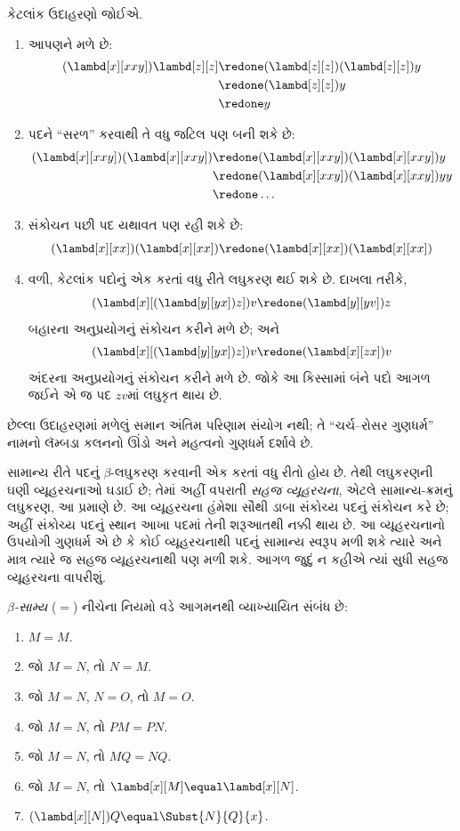 કેટલાંક ઉદાહરણો જોઈએ.
\begin{enumerate}
\item આપણને મળે છે:
\begin{align*}
(\lambd[x][xxy]) \lambd[z][z] & \redone (\lambd[z][z])(\lambd[z][z]) y \\
& \redone (\lambd[z][z]) y \\
& \redone y
\end{align*}
\item પદને ``સરળ'' કરવાથી તે વધુ જટિલ પણ બની શકે છે:
\begin{align*}
(\lambd[x][xxy])(\lambd[x][xxy]) & \redone (\lambd[x][xxy])(\lambd[x][xxy])y \\
& \redone (\lambd[x][xxy])(\lambd[x][xxy])yy \\
& \redone \dots
\end{align*}
\item સંકોચન પછી પદ યથાવત પણ રહી શકે છે:
\[
(\lambd[x][xx])(\lambd[x][xx]) \redone (\lambd[x][xx])(\lambd[x][xx])
\]
\item વળી, કેટલાંક પદોનું એક કરતાં વધુ રીતે લઘુકરણ
  થઈ શકે છે. દાખલા તરીકે,
\[
(\lambd[x][(\lambd[y][yx]) z]) v \redone (\lambd[y][yv]) z
\]
બહારના અનુપ્રયોગનું સંકોચન કરીને મળે છે; અને
\[
(\lambd[x][(\lambd[y][yx]) z]) v \redone (\lambd[x][zx]) v
\]
અંદરના અનુપ્રયોગનું સંકોચન કરીને મળે છે. જોકે આ
કિસ્સામાં બંને પદો આગળ જઈને એ જ પદ $zv$માં લઘુકૃત
થાય છે.
\end{enumerate}

છેલ્લા ઉદાહરણમાં મળેલું સમાન અંતિમ પરિણામ સંયોગ નથી;
તે ``ચર્ચ--રોસર ગુણધર્મ'' નામનો લૅમ્બડા કલનનો ઊંડો
અને મહત્વનો ગુણધર્મ દર્શાવે છે.

\begin{digress}
  સામાન્ય રીતે પદનું $\beta$-લઘુકરણ કરવાની એક કરતાં
  વધુ રીતો હોય છે. તેથી લઘુકરણની ઘણી વ્યૂહરચનાઓ
  ઘડાઈ છે; તેમાં અહીં વપરાતી \emph{સહજ વ્યૂહરચના},
  એટલે સામાન્ય-ક્રમનું લઘુકરણ, આ પ્રમાણે છે.
  આ વ્યૂહરચના હંમેશા સૌથી ડાબા સંકોચ્ય પદનું સંકોચન કરે
  છે; અહીં સંકોચ્ય પદનું સ્થાન આખા પદમાં તેની શરૂઆતથી
  નક્કી થાય છે. આ વ્યૂહરચનાનો ઉપયોગી ગુણધર્મ એ છે કે
  કોઈ વ્યૂહરચનાથી પદનું સામાન્ય સ્વરૂપ મળી શકે ત્યારે
  અને માત્ર ત્યારે જ સહજ વ્યૂહરચનાથી પણ મળી શકે.
  આગળ જુદું ન કહીએ ત્યાં સુધી સહજ વ્યૂહરચના વાપરીશું.
\end{digress}

\begin{defn}
  \emph{$\beta$-સામ્ય} ($\equal$) નીચેના નિયમો વડે
  આગમનથી વ્યાખ્યાયિત સંબંધ છે:
  \begin{enumerate}
  \item $M \equal M$.
  \item જો $M \equal N$, તો $N \equal M$.
  \item જો $M \equal N$, $N \equal O$, તો $M \equal O$.
  \item જો $M \equal N$, તો $PM \equal PN$.
  \item જો $M \equal N$, તો $MQ \equal NQ$.
  \item જો $M \equal N$, તો $\lambd[x][M] \equal \lambd[x][N]$.
  \item $(\lambd[x][N])Q \equal \Subst{N}{Q}{x}$.
  \end{enumerate}
\end{defn}

